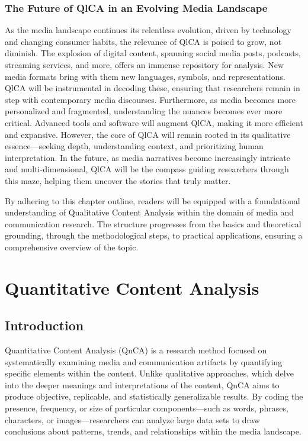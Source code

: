 \documentclass[
  b5paper]{book}
\begin{document}
\hypertarget{the-future-of-qlca-in-an-evolving-media-landscape}{%
\subsection*{The Future of QlCA in an Evolving Media Landscape}\label{the-future-of-qlca-in-an-evolving-media-landscape}}

As the media landscape continues its relentless evolution, driven by technology and changing consumer habits, the relevance of QlCA is poised to grow, not diminish. The explosion of digital content, spanning social media posts, podcasts, streaming services, and more, offers an immense repository for analysis. New media formats bring with them new languages, symbols, and representations. QlCA will be instrumental in decoding these, ensuring that researchers remain in step with contemporary media discourses. Furthermore, as media becomes more personalized and fragmented, understanding the nuances becomes ever more critical. Advanced tools and software will augment QlCA, making it more efficient and expansive. However, the core of QlCA will remain rooted in its qualitative essence---seeking depth, understanding context, and prioritizing human interpretation. In the future, as media narratives become increasingly intricate and multi-dimensional, QlCA will be the compass guiding researchers through this maze, helping them uncover the stories that truly matter.

By adhering to this chapter outline, readers will be equipped with a foundational understanding of Qualitative Content Analysis within the domain of media and communication research. The structure progresses from the basics and theoretical grounding, through the methodological steps, to practical applications, ensuring a comprehensive overview of the topic.

\hypertarget{quantitative-content-analysis-1}{%
\chapter{Quantitative Content Analysis}\label{quantitative-content-analysis-1}}

\hypertarget{introduction-4}{%
\section{Introduction}\label{introduction-4}}

Quantitative Content Analysis (QnCA) is a research method focused on systematically examining media and communication artifacts by quantifying specific elements within the content. Unlike qualitative approaches, which delve into the deeper meanings and interpretations of the content, QnCA aims to produce objective, replicable, and statistically generalizable results. By coding the presence, frequency, or size of particular components---such as words, phrases, characters, or images---researchers can analyze large data sets to draw conclusions about patterns, trends, and relationships within the media landscape.
\end{document}
